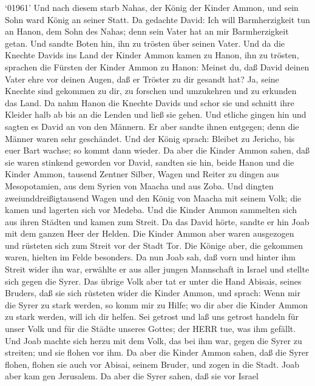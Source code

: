  `01961' Und nach diesem starb Nahas, der König der Kinder
Ammon, und sein Sohn ward König an seiner Statt.  Da
gedachte David: Ich will Barmherzigkeit tun an Hanon, dem Sohn des
Nahas; denn sein Vater hat an mir Barmherzigkeit getan. Und sandte Boten
hin, ihn zu trösten über seinen Vater. Und da die Knechte Davids ins
Land der Kinder Ammon kamen zu Hanon, ihn zu trösten, 
sprachen die Fürsten der Kinder Ammon zu Hanon: Meinst du, daß David
deinen Vater ehre vor deinen Augen, daß er Tröster zu dir gesandt hat?
Ja, seine Knechte sind gekommen zu dir, zu forschen und umzukehren und
zu erkunden das Land.  Da nahm Hanon die Knechte Davids und
schor sie und schnitt ihre Kleider halb ab bis an die Lenden und ließ
sie gehen.  Und etliche gingen hin und sagten es David an
von den Männern. Er aber sandte ihnen entgegen; denn die Männer waren
sehr geschändet. Und der König sprach: Bleibet zu Jericho, bis euer Bart
wachse; so kommt dann wieder.  Da aber die Kinder Ammon
sahen, daß sie waren stinkend geworden vor David, sandten sie hin, beide
Hanon und die Kinder Ammon, tausend Zentner Silber, Wagen und Reiter zu
dingen aus Mesopotamien, aus dem Syrien von Maacha und aus Zoba.
 Und dingten zweiunddreißigtausend Wagen und den König von
Maacha mit seinem Volk; die kamen und lagerten sich vor Medeba. Und die
Kinder Ammon sammelten sich aus ihren Städten und kamen zum Streit.
 Da das David hörte, sandte er hin Joab mit dem ganzen Heer
der Helden.  Die Kinder Ammon aber waren ausgezogen und
rüsteten sich zum Streit vor der Stadt Tor. Die Könige aber, die
gekommen waren, hielten im Felde besonders.  Da nun Joab
sah, daß vorn und hinter ihm Streit wider ihn war, erwählte er aus aller
jungen Mannschaft in Israel und stellte sich gegen die Syrer.
 Das übrige Volk aber tat er unter die Hand Abisais, seines
Bruders, daß sie sich rüsteten wider die Kinder Ammon,  und
sprach: Wenn mir die Syrer zu stark werden, so komm mir zu Hilfe; wo dir
aber die Kinder Ammon zu stark werden, will ich dir helfen.
 Sei getrost und laß uns getrost handeln für unser Volk und
für die Städte unseres Gottes; der HERR tue, was ihm gefällt.
 Und Joab machte sich herzu mit dem Volk, das bei ihm war,
gegen die Syrer zu streiten; und sie flohen vor ihm.  Da
aber die Kinder Ammon sahen, daß die Syrer flohen, flohen sie auch vor
Abisai, seinem Bruder, und zogen in die Stadt. Joab aber kam gen
Jerusalem.  Da aber die Syrer sahen, daß sie vor Israel
